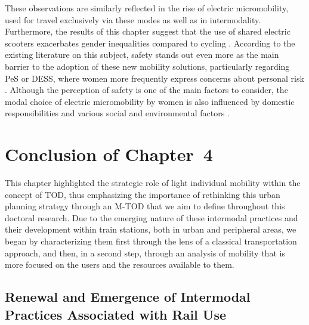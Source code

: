 \begin{refsegment}
These observations are similarly reflected in the rise of electric micromobility, used for travel exclusively via these modes as well as in intermodality. Furthermore, the results of this chapter suggest that the use of shared electric scooters exacerbates gender inequalities compared to cycling \textcolor{blue}{\autocite[7]{younes_gender_2023}}. According to the existing literature on this subject, safety stands out even more as the main barrier to the adoption of these new mobility solutions, particularly regarding \acrshort{PeS} or \acrshort{DESS}, where women more frequently express concerns about personal risk \textcolor{blue}{\autocite[10]{parnell_gender_2023}}. Although the perception of safety is one of the main factors to consider, the modal choice of electric micromobility by women is also influenced by domestic responsibilities and various social and environmental factors \textcolor{blue}{\autocite[22]{emond_explaining_2009}}.%

\newpage
{} %
\section*{Conclusion of Chapter~4
    \label{chap4:conclusion}
    }

This chapter highlighted the strategic role of light individual mobility within the concept of \acrshort{TOD}, thus emphasizing the importance of rethinking this urban planning strategy through an \acrshort{M-TOD} that we aim to define throughout this doctoral research. Due to the emerging nature of these intermodal practices and their development within train stations, both in urban and peripheral areas, we began by characterizing them first through the lens of a classical transportation approach, and then, in a second step, through an analysis of mobility that is more focused on the users and the resources available to them.%

\subsection*{Renewal and Emergence of Intermodal Practices Associated with Rail Use
    \label{chap4:principaux-enseignements-1}
    }


\end{refsegment}
